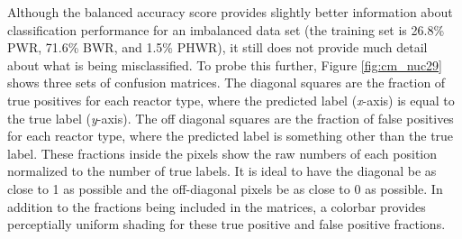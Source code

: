 Although the balanced accuracy score provides slightly better information about
classification performance for an imbalanced data set (the training set is
26.8\% \gls{PWR}, 71.6\% \gls{BWR}, and 1.5\% \gls{PHWR}), it still does not
provide much detail about what is being misclassified. To probe this further,
Figure \ref{fig:cm_nuc29} shows three sets of confusion matrices.  The diagonal
squares are the fraction of true positives for each reactor type, where the
predicted label (\textit{x}-axis) is equal to the true label (\textit{y}-axis).
The off diagonal squares are the fraction of false positives for each reactor
type, where the predicted label is something other than the true label.  These
fractions inside the pixels show the raw numbers of each position normalized to
the number of true labels.  It is ideal to have the diagonal be as close to 1
as possible and the off-diagonal pixels be as close to 0 as possible.  In
addition to the fractions being included in the matrices, a colorbar provides
perceptially uniform shading for these true positive and false positive
fractions. 


